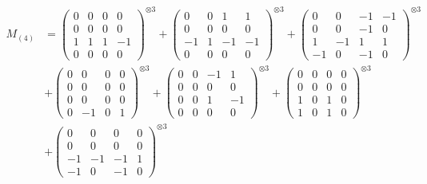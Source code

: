\documentclass{article}
\newcommand{\Mthree}{%
    M_{(4)}
}
\begin{document}
        \newpage
        
        \footnotesize{
        \begin{align}
        \Mthree
        &= \label{Rs16-Rc11-Solution-27-c1} \begin{pmatrix} 0 & 0 & 0 & 0 \\ 0 & 0 & 0 & 0 \\ 1 & 1 & 1 & -1 \\ 0 & 0 & 0 & 0 \end{pmatrix}^{\otimes 3} 
            + \begin{pmatrix} 0 & 0 & 1 & 1 \\ 0 & 0 & 0 & 0 \\ -1 & 1 & -1 & -1 \\ 0 & 0 & 0 & 0 \end{pmatrix}^{\otimes 3} 
            + \begin{pmatrix} 0 & 0 & -1 & -1 \\ 0 & 0 & -1 & 0 \\ 1 & -1 & 1 & 1 \\ -1 & 0 & -1 & 0 \end{pmatrix}^{\otimes 3} \\
        &+ \label{Rs16-Rc11-Solution-27-c4} \begin{pmatrix} 0 & 0 & 0 & 0 \\ 0 & 0 & 0 & 0 \\ 0 & 0 & 0 & 0 \\ 0 & -1 & 0 & 1 \end{pmatrix}^{\otimes 3} 
            + \begin{pmatrix} 0 & 0 & -1 & 1 \\ 0 & 0 & 0 & 0 \\ 0 & 0 & 1 & -1 \\ 0 & 0 & 0 & 0 \end{pmatrix}^{\otimes 3} 
            + \begin{pmatrix} 0 & 0 & 0 & 0 \\ 0 & 0 & 0 & 0 \\ 1 & 0 & 1 & 0 \\ 1 & 0 & 1 & 0 \end{pmatrix}^{\otimes 3} \\
        &+ \label{Rs16-Rc11-Solution-27-c7} \begin{pmatrix} 0 & 0 & 0 & 0 \\ 0 & 0 & 0 & 0 \\ -1 & -1 & -1 & 1 \\ -1 & 0 & -1 & 0 \end{pmatrix}^{\otimes 3} 

\end{align}}
\end{document}
